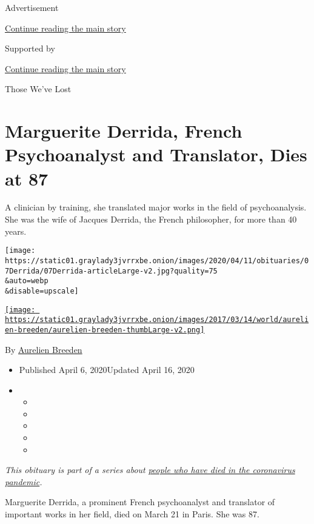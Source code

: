 Advertisement

\protect\hyperlink{after-top}{Continue reading the main story}

Supported by

\protect\hyperlink{after-sponsor}{Continue reading the main story}

Those We've Lost

\hypertarget{marguerite-derrida-french-psychoanalyst-and-translator-dies-at-87}{%
\section{Marguerite Derrida, French Psychoanalyst and Translator, Dies
at
87}\label{marguerite-derrida-french-psychoanalyst-and-translator-dies-at-87}}

A clinician by training, she translated major works in the field of
psychoanalysis. She was the wife of Jacques Derrida, the French
philosopher, for more than 40 years.

\texttt{[image: https://static01.graylady3jvrrxbe.onion/images/2020/04/11/obituaries/07Derrida/07Derrida-articleLarge-v2.jpg?quality=75\\\&auto=webp\\\&disable=upscale]}

\href{https://www.nytimes3xbfgragh.onion/by/aurelien-breeden}{\texttt{[image: https://static01.graylady3jvrrxbe.onion/images/2017/03/14/world/aurelien-breeden/aurelien-breeden-thumbLarge-v2.png]}}

By
\href{https://www.nytimes3xbfgragh.onion/by/aurelien-breeden}{Aurelien
Breeden}

\begin{itemize}
\item
  Published April 6, 2020Updated April 16, 2020
\item
  \begin{itemize}
  \item
  \item
  \item
  \item
  \item
  \end{itemize}
\end{itemize}

\emph{This obituary is part of a series about}
\href{https://www.nytimes3xbfgragh.onion/series/people-who-have-died-of-the-coronavirus}{\emph{people
who have died in the coronavirus pandemic}}\emph{.}

Marguerite Derrida, a prominent French psychoanalyst and translator of
important works in her field, died on March 21 in Paris. She was 87.

